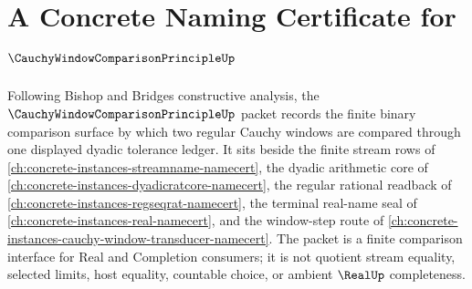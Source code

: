 \chapter{A Concrete Naming Certificate for $\CauchyWindowComparisonPrincipleUp$}
\label{ch:concrete-instances-cauchy-window-comparison-principle-namecert}

Following Bishop and Bridges constructive analysis, the $\CauchyWindowComparisonPrincipleUp$ packet records the finite binary comparison surface by which two regular Cauchy windows are compared through one displayed dyadic tolerance ledger. It sits beside the finite stream rows of \autoref{ch:concrete-instances-streamname-namecert}, the dyadic arithmetic core of \autoref{ch:concrete-instances-dyadicratcore-namecert}, the regular rational readback of \autoref{ch:concrete-instances-regseqrat-namecert}, the terminal real-name seal of \autoref{ch:concrete-instances-real-namecert}, and the window-step route of \autoref{ch:concrete-instances-cauchy-window-transducer-namecert}. The packet is a finite comparison interface for Real and Completion consumers; it is not quotient stream equality, selected limits, host equality, countable choice, or ambient $\RealUp$ completeness.

